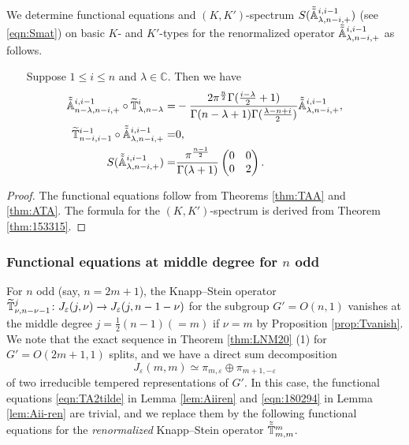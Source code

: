We determine functional equations
 and $(K,K')$-spectrum $S(\tilde{\tilde{{\mathbb{A}}}}_{{\lambda},{n-i},{+}}^{{i,i-1}})$
 (see \eqref{eqn:Smat})
 on basic $K$- and $K'$-types
 for the renormalized operator $\tilde{\tilde{{\mathbb{A}}}}_{{\lambda},{n-i},{+}}^{{i,i-1}}$
 as follows.  
 
\begin{lemma}
\label{lem:Aii-ren}
~~~\newline
Suppose $1 \le i \le n$ and $\lambda \in {\mathbb{C}}$.  
Then we have 
\begin{align}
\label{eqn:1802119}
\tilde{\tilde{{\mathbb{A}}}}_{{n-\lambda},{n-i},{+}}^{{i,i-1}} \circ \widetilde{{\mathbb{T}}}_{{\lambda},{n-\lambda}}^{{i}}
=&
-\frac{2\pi^{\frac n 2}\Gamma(\frac{i-\lambda}2+1)}{\Gamma(n-\lambda+1)\Gamma(\frac{\lambda-n+i}{2})}
 \tilde{\tilde{{\mathbb{A}}}}_{{\lambda},{n-i},{+}}^{{i,i-1}}, 
\\
\label{eqn:180294}
\widetilde{{\mathbb{T}}}_{{n-i},{i-1}}^{{i-1}}\circ
\tilde{\tilde{{\mathbb{A}}}}_{{\lambda},{n-i},{+}}^{{i,i-1}} 
=&
0, 
\\
S(\tilde{\tilde{{\mathbb{A}}}}_{{\lambda},{n-i},{+}}^{{i,i-1}}) =& \frac{\pi^{\frac {n-1} 2}}{\Gamma(\lambda+1)}
\begin{pmatrix} 0 & 0 \\ 0 & 2 \end{pmatrix}.  
\notag
\end{align}
\end{lemma}

\begin{proof}
The functional equations follow from Theorems \ref{thm:TAA} and \ref{thm:ATA}.  The formula for the $(K,K')$-spectrum
 is derived from Theorem \ref{thm:153315}.  
\end{proof}


\subsubsection{Functional equations at middle degree for $n$ odd}
For $n$ odd 
 (say, $n=2m+1$), 
 the Knapp--Stein operator $\widetilde{{\mathbb{T}}}_{{\nu},{n-\nu-1}}^{{j}} \colon J_{\varepsilon}(j,\nu) \to J_{\varepsilon}(j,n-1-\nu)$ 
 for the subgroup $G'=O(n,1)$ vanishes
 at the middle degree $j=\frac 1 2 (n-1) (=m)$ 
 if $\nu=m$ by Proposition \ref{prop:Tvanish}.  
We note that the exact sequence in Theorem \ref{thm:LNM20} (1)
 for $G'=O(2m+1,1)$ splits, 
 and we have a direct sum decomposition 
\[
  J_{\varepsilon}(m,m) \simeq \pi_{m,\varepsilon} \oplus \pi_{m+1,-\varepsilon}
\]
 of two irreducible tempered representations of $G'$.  
In this case,
 the functional equations \eqref{eqn:TA2tilde}
 in Lemma \ref{lem:Aiiren}
 and \eqref{eqn:180294} in Lemma \ref{lem:Aii-ren} are trivial,
 and we replace them
 by the following functional equations
 for the {\it{renormalized}} Knapp--Stein operator
 $\tilde{\tilde{{\mathbb{T}}}}_{{m},{m}}^{{m}}$.  

